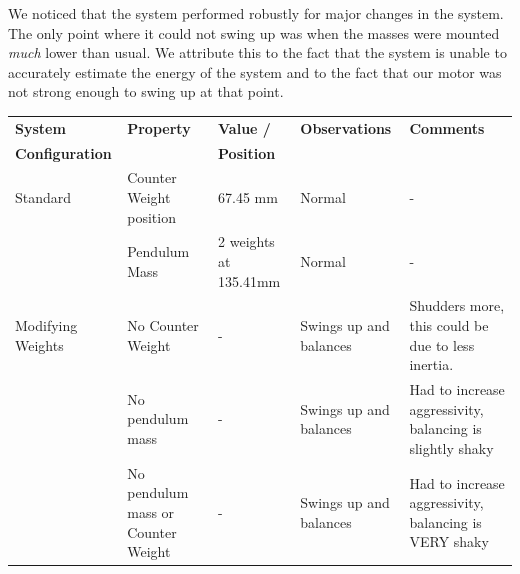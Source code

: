 \documentclass{article}
\theoremstyle{plain}
\theoremstyle{definition}
\theoremstyle{remark}
\begin{document}
We noticed that the system performed robustly for major changes in the system. The only point where it could not swing up was when the masses were mounted \emph{much} lower than usual. We attribute this to the fact that the system is unable to accurately estimate the energy of the system and to the fact that our motor was not strong enough to swing up at that point.

\begin{table}[htb]
\begin{center}
    \begin{tabular}{|p{2.5cm}||p{3cm}|p{2cm}|p{2.5cm}|p{6cm}|}
        \hline
        \textbf{System}                        &\textbf{ Property}                           & \textbf{Value /}               & \textbf{Observations}                        & \textbf{Comments}                                                                                                 \\ 
        \textbf{Configuration}                 & ~                                  & \textbf{Position}              & ~                                   & ~                                                                                                        \\ \hline \hline
        Standard                      & Counter Weight position            & 67.45 mm              & Normal                              & -                                                                                                        \\ \hline
        ~                             & Pendulum Mass                      & 2 weights at 135.41mm & Normal                              & -                                                                                                        \\ \hline \hline
        Modifying Weights             & No Counter Weight                  & -                     & Swings up and balances              & Shudders more, this could be due to less inertia.                                                        \\ \hline
        ~                             & No pendulum mass                   & -                     & Swings up and balances              & Had to increase aggressivity, balancing is slightly shaky                                                \\ \hline
        ~                             & No pendulum mass or Counter Weight & -                     & Swings up and balances              & Had to increase aggressivity, balancing is VERY shaky                                                    \\ \hline \hline

\end{tabular}
\end{center}
\end{table}
\end{document}
